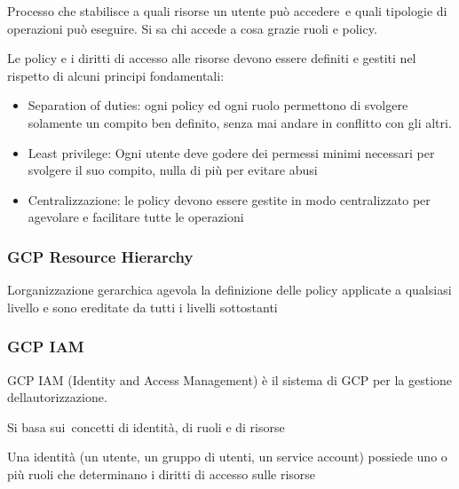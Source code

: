 \documentclass[
]{article}
\providecommand{\tightlist}{%
  \setlength{\itemsep}{0pt}\setlength{\parskip}{0pt}}
\begin{document}
{Processo che stabilisce a }{quali risorse un utente può accedere}{~e
quali tipologie di operazioni può eseguire. Si sa chi accede a cosa
grazie ruoli e policy.}

{}

{Le policy e i diritti di accesso alle risorse devono essere definiti e
gestiti nel rispetto di alcuni principi fondamentali: }

\begin{itemize}
\tightlist
\item
  {Separation of duties}{: ogni policy ed ogni ruolo permettono di
  svolgere solamente un compito ben definito, senza mai andare in
  conflitto con gli altri. }
\item
  {Least privilege}{: Ogni utente deve godere dei permessi minimi
  necessari per svolgere il suo compito, nulla di più per evitare abusi
  }
\item
  {Centralizzazione}{: le policy devono essere gestite in modo
  centralizzato per agevolare e facilitare tutte le operazioni}
\end{itemize}

\subsubsection{\texorpdfstring{{GCP Resource
Hierarchy}}{GCP Resource Hierarchy}}\label{h.skasw54n8vee}

{L\textquotesingle organizzazione gerarchica agevola la definizione
delle policy applicate a qualsiasi livello e sono ereditate da tutti i
livelli sottostanti}

\subsubsection{\texorpdfstring{{GCP
IAM}}{GCP IAM}}\label{h.utrdjqahbzbw}

{GCP IAM (Identity and Access Management) è il sistema di GCP per la
gestione dell\textquotesingle autorizzazione. }

{Si basa }{sui}{~concetti di identità, di ruoli e di risorse}

{}

{Una identità (un utente, un gruppo di utenti, un service account)
possiede uno o più ruoli che determinano i diritti di accesso sulle
risorse}

{}
\end{document}
